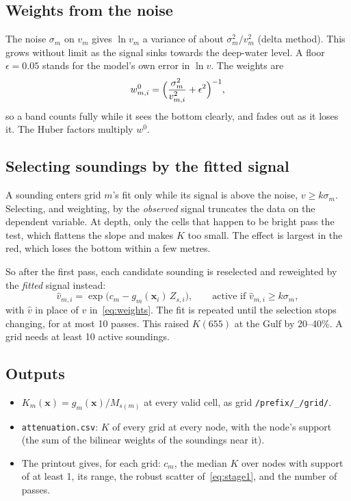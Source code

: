 \documentclass[11pt]{article}
\numberwithin{equation}{section}
\newcommand{\bx}{\mathbf{x}}
\newcommand{\code}[1]{\texttt{#1}}
\begin{document}
\subsection{Weights from the noise}

The noise $\sigma_m$ on $v_m$ gives $\ln v_m$ a variance of about $\sigma_m^2/v_m^2$ (delta
method). This grows without limit as the signal sinks towards the deep-water level. A floor
$\epsilon = 0.05$ stands for the model's own error in $\ln v$. The weights are
\begin{equation}
  w^{0}_{m,i} = \Bigl(\frac{\sigma_m^2}{v_{m,i}^2} + \epsilon^2\Bigr)^{-1},
  \label{eq:weights}
\end{equation}
so a band counts fully while it sees the bottom clearly, and fades out as it loses it. The
Huber factors multiply $w^{0}$.

\subsection{Selecting soundings by the fitted signal}

A sounding enters grid $m$'s fit only while its signal is above the noise, $v \ge k\sigma_m$.
Selecting, and weighting, by the \emph{observed} signal truncates the data on the dependent
variable. At depth, only the cells that happen to be bright pass the test, which flattens the
slope and makes $K$ too small. The effect is largest in the red, which loses the bottom within a
few metres.

So after the first pass, each candidate sounding is reselected and reweighted by the
\emph{fitted} signal instead:
\begin{equation}
  \hat v_{m,i} = \exp\bigl(c_m - g_m(\bx_i)\, Z_{s,i}\bigr),
  \qquad \text{active if } \hat v_{m,i} \ge k\sigma_m,
\end{equation}
with $\hat v$ in place of $v$ in~\eqref{eq:weights}. The fit is repeated until the selection
stops changing, for at most 10 passes. This raised $K(655)$ at the Gulf by 20--40\%. A grid needs
at least 10 active soundings.

\subsection{Outputs}

\begin{itemize}
\item $K_m(\bx) = g_m(\bx)/M_{s(m)}$ at every valid cell, as grid \code{/prefix/\_/grid/}.
\item \code{attenuation.csv}: $K$ of every grid at every node, with the node's support (the sum
  of the bilinear weights of the soundings near it).
\item The printout gives, for each grid: $c_m$, the median $K$ over nodes with support of at
  least 1, its range, the robust scatter of~\eqref{eq:stage1}, and the number of passes.
\end{itemize}
\end{document}
